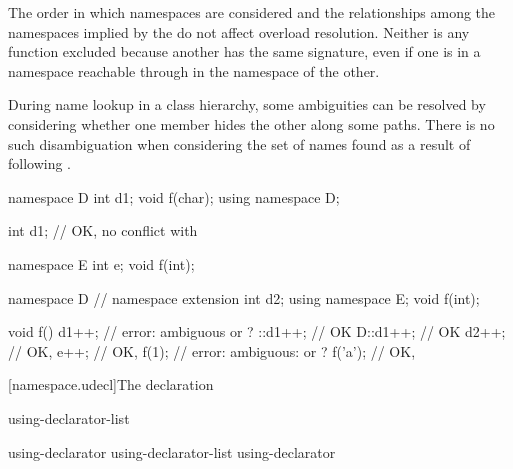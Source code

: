 \pnum
{}%
\begin{note}
The order in which namespaces are considered and the
relationships among the namespaces implied by the
 do not affect overload resolution.
Neither is any function excluded because another has the same
signature, even if one is in a namespace reachable through
 in the namespace of the other.
\begin{footnote}
During
name lookup in a class hierarchy, some ambiguities can be
resolved by considering whether one member hides the other along some
paths. There is no such disambiguation when
considering the set of names found as a result of following
.
\end{footnote}
\end{note}
\begin{example}
\begin{codeblock}
namespace D {
  int d1;
  void f(char);
}
using namespace D;

int d1;             // OK, no conflict with 

namespace E {
  int e;
  void f(int);
}

namespace D {       // namespace extension
  int d2;
  using namespace E;
  void f(int);
}

void f() {
  d1++;             // error: ambiguous  or ?
  ::d1++;           // OK
  D::d1++;          // OK
  d2++;             // OK, 
  e++;              // OK, 
  f(1);             // error: ambiguous:  or ?
  f('a');           // OK, 
}
\end{codeblock}
\end{example}
%

[namespace.udecl]{The  declaration}%

\begin{bnf}
\br
     using-declarator-list \terminal{;}
\end{bnf}

\begin{bnf}
\br
    using-declarator \br
    using-declarator-list \terminal{,} using-declarator 
\end{bnf}

